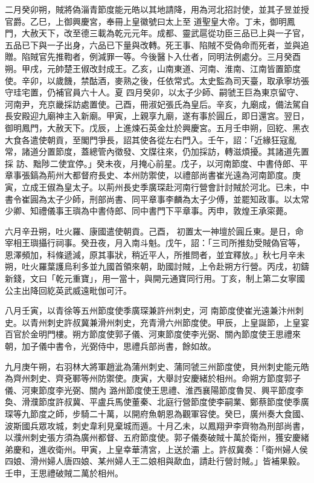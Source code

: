 \begin{pinyinscope}
 二月癸卯朔，賊將偽淄青節度能元皓以其地請降，用為河北招討使，並其子昱並授官爵。乙巳，上御興慶宮，奉冊上皇徽號曰太上至
 道聖皇大帝。丁未，御明鳳門，大赦天下，改至德三載為乾元元年。成都、靈武扈從功臣三品已上與一子官，五品已下與一子出身，六品已下量與改轉。死王事、陷賊不受偽命而死者，並與追贈。陷賊官先推鞫者，例減罪一等。今後醫卜入仕者，同明法例處分。三月癸酉朔。甲戌，元帥楚王俶改封成王。乙亥，山南東道、河南、淮南、江南皆置節度使。辛卯，以歲饑，禁酤酒，麥熟之後，任依常式。太史監為司天臺，取承寧坊張守珪宅置，仍補官員六十人。夏
 四月癸卯，以太子少師、嗣虢王巨為東京留守、河南尹，充京畿採訪處置使。己酉，冊淑妃張氏為皇后。辛亥，九廟成，備法駕自長安殿迎九廟神主入新廟。甲寅，上親享九廟，遂有事於圓丘，即日還宮。翌日，御明鳳門，大赦天下。戊辰，上進煉石英金灶於興慶宮。五月壬申朔，回紇、黑衣大食各遣使朝貢，至閣門爭長，詔其使各從左右門入。壬午，詔：「近緣狂寇亂常，諸道分置節度，蓋總管內徵發、文牒往來，仍加採訪，轉滋煩擾。其諸道先置採
 訪、黜陟二使宜停。」癸未夜，月掩心前星。戊子，以河南節度、中書侍郎、平章事張鎬為荊州大都督府長史、本州防禦使，以禮部尚書崔光遠為河南節度。庚寅，立成王俶為皇太子。以荊州長史季廣琛赴河南行營會計討賊於河北。已未，中書令崔圓為太子少師，刑部尚書、同平章事李麟為太子少傅，並罷知政事。以太常少卿、知禮儀事王璵為中書侍郎、同中書門下平章事。丙申，敦煌王承寀薨。



 六月辛丑朔，吐火羅、康國遣使朝貢。己酉，
 初置太一神壇於圓丘東。是日，命宰相王璵攝行祠事。癸丑夜，月入南斗魁。戊午，詔：「三司所推劾受賊偽官等，恩澤頻加，科條遞減，原其事狀，稍近平人，所推問者，並宜釋放。」秋七月辛未朔，吐火羅葉護烏利多並九國首領來朝，助國討賊，上令赴朔方行營。丙戌，初鑄新錢，文曰「乾元重寶」，用一當十，與開元通寶同行用。丁亥，制上第二女寧國公主出降回紇英武威遠毗伽可汗。



 八月壬寅，以青徐等五州節度使季廣琛兼許州刺史，河
 南節度使崔光遠兼汴州刺史。以青州刺史許叔冀兼滑州刺史，充青滑六州節度使。甲辰，上皇誕節，上皇宴百官於金明門樓。朔方節度使郭子儀、河東節度使李光弼、關內節度使王思禮來朝，加子儀中書令，光弼侍中，思禮兵部尚書，餘如故。



 九月庚午朔，右羽林大將軍趙泚為蒲州刺史、蒲同虢三州節度使，貝州刺史能元皓為齊州刺史、齊兗鄆等州防禦使。庚寅，大舉討安慶緒於相州。命朔方節度郭子儀、河東節度李光弼、關內
 潞州節度使王思禮、淮西襄陽節度魯炅、興平節度李奐、滑濮節度許叔冀、平盧兵馬使董秦、北庭行營節度使李嗣業、鄭蔡節度使季廣琛等九節度之師，步騎二十萬，以開府魚朝恩為觀軍容使。癸巳，廣州奏大食國、波斯國兵眾攻城，刺史韋利見棄城而遁。十月乙未，以鳳翔尹李齊物為刑部尚書，以濮州刺史張方須為廣州都督、五府節度使。郭子儀奏破賊十萬於衛州，獲安慶緒弟慶和，進收衛州。甲寅，上皇幸華清宮，上送於灞
 上。許叔冀奏：「衛州婦人侯四娘、滑州婦人唐四娘、某州婦人王二娘相與歃血，請赴行營討賊。」皆補果毅。壬申，王思禮破賊二萬於相州。




\end{pinyinscope}
